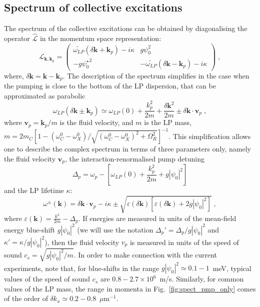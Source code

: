 \subsection{Spectrum of collective excitations}
\label{sec:spect}
%
The spectrum of the collective excitations can be obtained by
diagonalising the operator $\hat{\mathcal{L}}$ in the momentum space
representation:
%
\begin{equation}
  \mathcal{L}_{\bm{k},\bm{k}_p} = \begin{pmatrix}
    \widetilde{\omega_{LP}} (\delta \bm{k}+\bm{k}_p) - i \kappa &
    g \psi_0^2 \\ -g {\psi_0^{\star}}^2 & -
    \widetilde{\omega_{LP}}(\delta \bm{k}-\bm{k}_p) -
    i\kappa \end{pmatrix}\; ,
\label{eq:opell}
\end{equation}
%
where, $\delta \bm{k} = \bm{k} - \bm{k}_p$. The description of
the spectrum simplifies in the case when the pumping is close to the
bottom of the LP dispersion, that can be approximated as parabolic
%
\begin{equation}
  \omega_{LP} (\delta \bm{k} \pm \bm{k}_p) \simeq \omega_{LP}(0) +
  \frac{k_p^2}{2m} + \frac{\delta \bm{k}^2}{2m} \pm \delta \bm{k}
  \cdot \bm{v}_p \; ,
\end{equation}
%
where $\bm{v}_p=\bm{k}_p/m$ is the fluid velocity, and $m$ is the
LP mass, $m = 2m_C [1 - (\omega_C^0 - \omega_X^0)/\sqrt{(\omega_C^0 -
    \omega_X^0)^2 + \Omega_R^2}]^{-1}$. This simplification allows one
to describe the complex spectrum in terms of three parameters only,
namely the fluid velocity $\bm{v}_p$, the interaction-renormalised
pump detuning
%
\begin{equation}
  \Delta_p = \omega_p - \left[\omega_{LP} (0) +\frac{k_p^2}{2m} +
    g|\psi_0|^2\right]
\end{equation}
%
and the LP lifetime $\kappa$:
%
\begin{equation}
  \omega^{\pm} (\bm{k}) = \delta \bm{k}\cdot \bm{v}_p - i\kappa
  \pm \sqrt{\varepsilon(\delta \bm{k}) \left[\varepsilon(\delta
      \bm{k}) + 2g|\psi_0|^2\right]} \; ,
\label{eq:spect}
\end{equation}
%
where $\varepsilon(\bm{k}) = \frac{k^2}{2m} - \Delta_p$. If energies
are measured in units of the mean-field energy blue-shift $g
|\psi_0|^2$ (we will use the notation $\Delta_p' =
\Delta_p/g|\psi_0|^2$ and $\kappa'= \kappa/g|\psi_0|^2$), then the
fluid velocity $v_p$ is measured in units of the speed of sound $c_s =
\sqrt{g|\psi_0|^2/m}$. In order to make connection with the current
experiments, note that, for blue-shifts in the range $g |\psi_0|^2
\simeq 0.1-1$~meV, typical values of the speed of sound $c_s$ are
$0.8-2.7\times 10^6$~m/s. Similarly, for common values of the LP mass,
the range in momenta in Fig.~\ref{fig:spect_pmp_only} comes of the order of
$\delta k_x \simeq 0.2-0.8$~$\mu$m${}^{-1}$.

